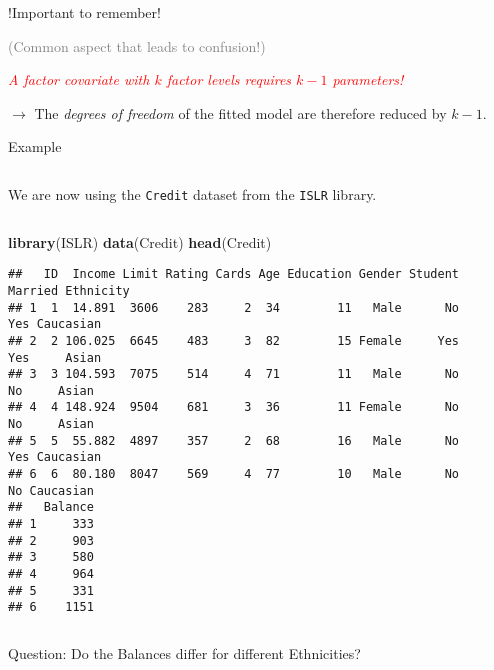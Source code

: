 \documentclass[10pt,ignorenonframetext,]{beamer}
\newenvironment{Shaded}{\begin{snugshade}}{\end{snugshade}}
\newcommand{\KeywordTok}[1]{\textcolor[rgb]{0.13,0.29,0.53}{\textbf{#1}}}
\newcommand{\NormalTok}[1]{#1}
\begin{document}
\begin{frame}

\begin{block}{!Important to remember!}

\textcolor{gray}{(Common aspect that leads to confusion!)}

\vspace{10mm}

\emph{\textcolor{red}{A factor covariate with $k$ factor levels requires $k-1$ parameters!}}
\vspace{2mm}

\(\rightarrow\) The \emph{degrees of freedom} of the fitted model are
therefore reduced by \(k-1\).

\end{block}

\end{frame}

\begin{frame}[fragile]

\begin{block}{Example}

\(~\)

We are now using the \texttt{Credit} dataset from the \texttt{ISLR}
library.

\(~\)

\scriptsize

\begin{Shaded}
\begin{Highlighting}[]
\KeywordTok{library}\NormalTok{(ISLR)}
\KeywordTok{data}\NormalTok{(Credit)}
\KeywordTok{head}\NormalTok{(Credit)}
\end{Highlighting}
\end{Shaded}

\begin{verbatim}
##   ID  Income Limit Rating Cards Age Education Gender Student Married Ethnicity
## 1  1  14.891  3606    283     2  34        11   Male      No     Yes Caucasian
## 2  2 106.025  6645    483     3  82        15 Female     Yes     Yes     Asian
## 3  3 104.593  7075    514     4  71        11   Male      No      No     Asian
## 4  4 148.924  9504    681     3  36        11 Female      No      No     Asian
## 5  5  55.882  4897    357     2  68        16   Male      No     Yes Caucasian
## 6  6  80.180  8047    569     4  77        10   Male      No      No Caucasian
##   Balance
## 1     333
## 2     903
## 3     580
## 4     964
## 5     331
## 6    1151
\end{verbatim}

\(~\)

\normalsize

Question: Do the Balances differ for different Ethnicities?

\end{block}

\end{frame}
\end{document}
